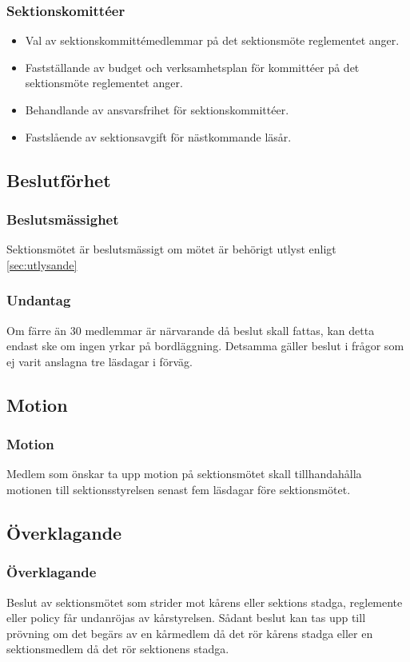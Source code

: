 \subsubsection{Sektionskomittéer}
\begin{itemize}
	\item Val av sektionskommittémedlemmar på det sektionsmöte reglementet anger.
	\item Fastställande av budget och verksamhetsplan för kommittéer på det sektionsmöte reglementet anger. 
	\item Behandlande av ansvarsfrihet för sektionskommittéer.
	\item Fastslående av sektionsavgift för nästkommande läsår.
\end{itemize}

\subsection{Beslutförhet}

\subsubsection{Beslutsmässighet}
Sektionsmötet är beslutsmässigt om mötet är behörigt utlyst enligt \ref{sec:utlysande}

\subsubsection{Undantag}
Om färre än 30 medlemmar är närvarande då beslut skall fattas, kan detta endast ske om ingen yrkar på bordläggning. Detsamma gäller beslut i frågor som ej varit anslagna tre läsdagar i förväg.

\subsection{Motion}

\subsubsection{Motion}
Medlem som önskar ta upp motion på sektionsmötet skall tillhandahålla motionen till sektionsstyrelsen senast fem läsdagar före sektionsmötet.

\subsection{Överklagande}

\subsubsection{Överklagande}
Beslut av sektionsmötet som strider mot kårens eller sektions stadga, reglemente eller policy får undanröjas av kårstyrelsen. Sådant beslut kan tas upp till prövning om det begärs av en kårmedlem då det rör kårens stadga eller en sektionsmedlem då det rör sektionens stadga.

